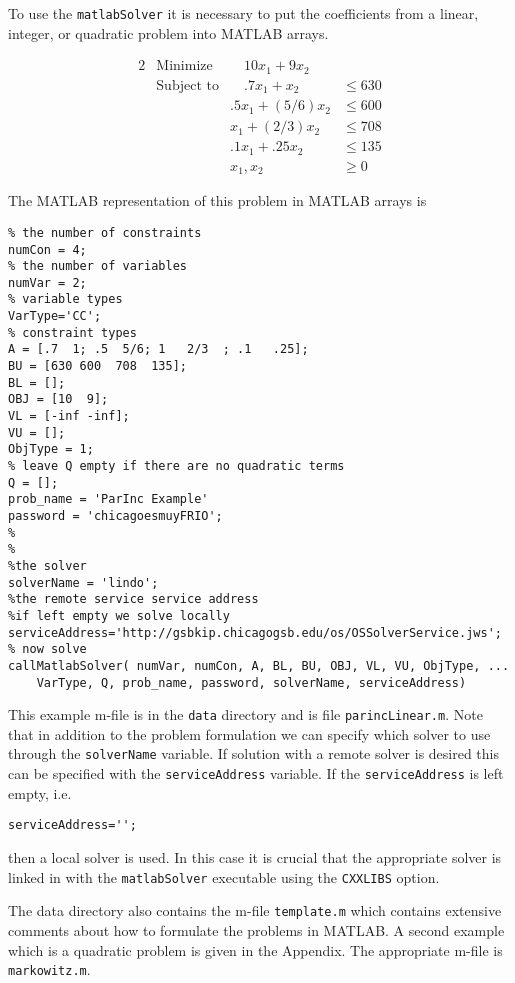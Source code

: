 \documentclass[11pt]{article}
\renewcommand{\_}{{\char"5F}}
\renewcommand{\{}{{\char"7B}}
\renewcommand{\}}{{\char"7D}}
\renewcommand{\^}{{\char"0D}}
\renewcommand{\'}{{\char"0D}}
\begin{document}
To use the {\tt matlabSolver} it is necessary to put the coefficients  from a linear, integer, or quadratic problem into MATLAB arrays.

\begin{alignat}{2}
& \mbox{Minimize} & \quad
10 x_{1} + 9 x_{2}\label{eq:parinobj}\\
& \mbox{Subject to} & \quad .7x_{1} + x_{2}  &\le 630  \label{eq:parinccon1}\\
& & .5x_{1} + (5/6) x_{2} &\le 600 \label{eq:parinccon2}\\
& &  x_{1} + (2/3) x_{2} &\le 708 \label{eq:parinccon3}\\
& & .1x_{1} + .25 x_{2} &\le 135 \label{eq:parinccon4}\\
& & x_{1}, x_{2} &\ge 0 \label{eq:parincnonneg}
\end{alignat}

The MATLAB representation of this problem in MATLAB arrays is
\begin{verbatim}
% the number of constraints
numCon = 4;
% the number of variables
numVar = 2;
% variable types
VarType='CC';
% constraint types
A = [.7  1; .5  5/6; 1   2/3  ; .1   .25];
BU = [630 600  708  135];
BL = [];
OBJ = [10  9];
VL = [-inf -inf];
VU = [];
ObjType = 1;
% leave Q empty if there are no quadratic terms
Q = [];
prob_name = 'ParInc Example'
password = 'chicagoesmuyFRIO';
%
%
%the solver
solverName = 'lindo';
%the remote service service address
%if left empty we solve locally
serviceAddress='http://gsbkip.chicagogsb.edu/os/OSSolverService.jws';
% now solve
callMatlabSolver( numVar, numCon, A, BL, BU, OBJ, VL, VU, ObjType, ...
    VarType, Q, prob_name, password, solverName, serviceAddress)
\end{verbatim}
This example m-file is in the {\tt data} directory and is file {\tt parincLinear.m}. Note that in addition to the problem formulation we can specify which solver to use through the {\tt solverName} variable.  If solution with a remote solver is desired this can be specified with the {\tt serviceAddress} variable.  If the {\tt serviceAddress} is left empty, i.e.
\begin{verbatim}
serviceAddress='';
\end{verbatim}
then a local solver is used. In this case  it is crucial that the appropriate solver is linked in with the {\tt matlabSolver} executable using the {\tt CXXLIBS} option.


The data directory  also contains the m-file  {\tt template.m} which contains extensive comments about how to formulate the problems in MATLAB.  A second example which is a quadratic problem is given in the Appendix. The appropriate m-file is {\tt markowitz.m}.
\end{document}
